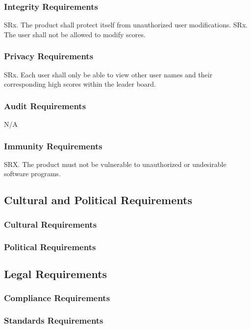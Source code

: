 \documentclass{article}
\begin{document}
    \subsubsection{Integrity Requirements}
    SRx. The product shall protect itself from unauthorized user modifications.
    SRx. The user shall not be allowed to modify scores.
    
    \subsubsection{Privacy Requirements}
    SRx. Each user shall only be able to view other user names and their corresponding high scores within the leader board.
    
    \subsubsection{Audit Requirements}
    N/A
    
    \subsubsection{Immunity Requirements}
    SRX. The product must not be vulnerable to unauthorized or undesirable software programs.
    
\subsection{Cultural and Political Requirements}
    \subsubsection{Cultural Requirements}
    \subsubsection{Political Requirements}    
    
\subsection{Legal Requirements}
    \subsubsection{Compliance Requirements}
    \subsubsection{Standards Requirements}    
\end{document}
